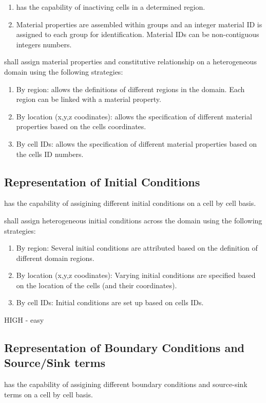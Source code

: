 \begin{enumerate}
	\item \pft has the capability of inactiving cells in a determined region.
	\item Material properties are assembled within groups and an integer  material ID is assigned to each group for identification. Material IDs can be non-contiguous integers numbers.
\end{enumerate}

\pft shall assign material properties and constitutive relationship on a heterogeneous domain using the following strategies:
\begin{enumerate}[resume]
	\item By region: \label{repMatPropRegions} \pft allows the definitions of different regions in the domain. Each region can be linked with a material property.
	\item  By location (x,y,z coodinates): \label{repMatPropLocation} \pft allows the specification of different material properties based on the cells coordinates.
	\item  By cell IDs: \label{repMatPropCellID} \pft allows the specification of different material properties based on the cells ID numbers.
\end{enumerate}


\subsection{Representation of Initial Conditions}
\pft has the capability of assigining different initial conditions on a cell by cell basis.

\pft shall assign heterogeneous initial conditions across the domain using the following strategies:
\begin{enumerate}
	\item By region: \label{repICRegions} Several initial conditions are attributed based on the definition of different domain regions.
	\item By location (x,y,z coodinates): \label{repICLocation} Varying initial conditions are specified based on the location of the cells (and their coordinates).
	\item By cell IDs: \label{repICCellID} Initial conditions are set up based on cells IDs.
\end{enumerate}
HIGH - easy

\subsection{Representation of Boundary Conditions and Source/Sink terms}
\pft has the capability of assigining different boundary conditions and source-sink terms on a cell by cell basis.

